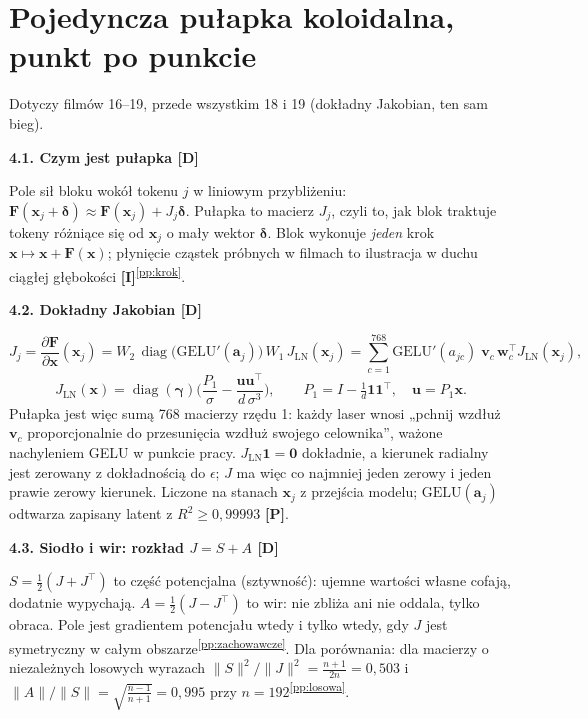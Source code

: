 \documentclass[a4paper,11pt]{article}
\newcommand{\stD}{\textcolor{dok}{\textsf{\textbf{[D]}}}}
\newcommand{\stP}{\textcolor{pom}{\textsf{\textbf{[P]}}}}
\newcommand{\stI}{\textcolor{ilu}{\textsf{\textbf{[I]}}}}
\newcommand{\LN}{\mathrm{LN}}
\newcommand{\GELU}{\mathrm{GELU}}
\newcommand{\pp}[1]{\textsuperscript{\ref{pp:#1}}}
\newcommand{\elem}[1]{\par\medskip\noindent\textbf{#1}\par\nopagebreak}
\begin{document}
\section{Pojedyncza pułapka koloidalna, punkt po punkcie}\label{sec:pulapka}
Dotyczy filmów 16--19, przede wszystkim 18 i 19 (dokładny Jakobian, ten sam bieg).

\elem{4.1. Czym jest pułapka \stD}
Pole sił bloku wokół tokenu $j$ w liniowym przybliżeniu: $\bm F(\bm x_j+\bm\delta)\approx\bm F(\bm x_j)+J_j\bm\delta$. Pułapka to
macierz $J_j$, czyli to, jak blok traktuje tokeny różniące się od $\bm x_j$ o mały wektor $\bm\delta$. Blok wykonuje \emph{jeden} krok
$\bm x\mapsto\bm x+\bm F(\bm x)$; płynięcie cząstek próbnych w filmach to ilustracja w duchu ciągłej głębokości \stI\pp{krok}.

\elem{4.2. Dokładny Jakobian \stD}
\begin{equation}
J_j=\frac{\partial\bm F}{\partial\bm x}(\bm x_j)=W_2\,\operatorname{diag}\!\big(\GELU'(\bm a_j)\big)\,W_1\,J_{\LN}(\bm x_j)
=\sum_{c=1}^{768}\GELU'(a_{jc})\;\bm v_c\,\bm w_c^{\!\top}J_{\LN}(\bm x_j),
\end{equation}
\begin{equation}
J_{\LN}(\bm x)=\operatorname{diag}(\bm\gamma)\Big(\frac{P_1}{\sigma}-\frac{\bm u\bm u^{\!\top}}{d\,\sigma^3}\Big),\qquad
P_1=I-\tfrac1d\bm 1\bm 1^{\!\top},\quad \bm u=P_1\bm x.
\end{equation}
Pułapka jest więc sumą 768 macierzy rzędu 1: każdy laser wnosi „pchnij wzdłuż $\bm v_c$ proporcjonalnie do przesunięcia wzdłuż
swojego celownika”, ważone nachyleniem GELU w punkcie pracy. $J_{\LN}\bm 1=\bm 0$ dokładnie, a kierunek radialny jest zerowany
z dokładnością do $\epsilon$; $J$ ma więc co najmniej jeden zerowy i jeden prawie zerowy kierunek. Liczone na stanach $\bm x_j$
z przejścia modelu; $\GELU(\bm a_j)$ odtwarza zapisany latent z $R^2\ge0{,}99993$ \stP.

\elem{4.3. Siodło i wir: rozkład $J=S+A$ \stD}
$S=\tfrac12(J+J^{\!\top})$ to część potencjalna (sztywność): ujemne wartości własne cofają, dodatnie wypychają. $A=\tfrac12(J-J^{\!\top})$
to wir: nie zbliża ani nie oddala, tylko obraca. Pole jest gradientem potencjału wtedy i tylko wtedy, gdy $J$ jest symetryczny
w całym obszarze\pp{zachowawcze}. Dla porównania: dla macierzy o niezależnych losowych wyrazach
$\lVert S\rVert^2/\lVert J\rVert^2=\frac{n+1}{2n}=0{,}503$ i $\lVert A\rVert/\lVert S\rVert=\sqrt{\frac{n-1}{n+1}}=0{,}995$ przy $n=192$\pp{losowa}.
\end{document}
